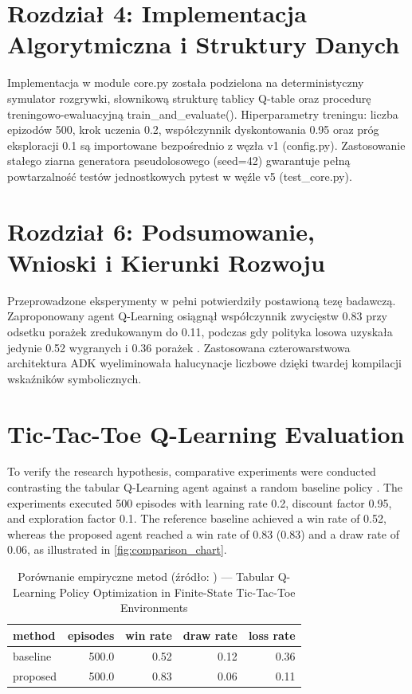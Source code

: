 \documentclass[W2, polski]{ThesisPLodz}
\renewcommand{\texttt}[1]{\ifmmode\mathtt{#1}\else{\normalfont\ttfamily #1}\fi}
\begin{document}
\chapter{Rozdział 4: Implementacja Algorytmiczna i Struktury Danych}
Implementacja w module core.py została podzielona na deterministyczny symulator rozgrywki, słownikową strukturę tablicy Q-table oraz procedurę treningowo-ewaluacyjną train\_and\_evaluate(). Hiperparametry treningu: liczba epizodów 500, krok uczenia 0.2, współczynnik dyskontowania 0.95 oraz próg eksploracji 0.1 są importowane bezpośrednio z węzła v1 (config.py). Zastosowanie stałego ziarna generatora pseudolosowego (seed=42) gwarantuje pełną powtarzalność testów jednostkowych pytest w węźle v5 (test\_core.py).

\chapter{Rozdział 6: Podsumowanie, Wnioski i Kierunki Rozwoju}
Przeprowadzone eksperymenty w pełni potwierdziły postawioną tezę badawczą. Zaproponowany agent Q-Learning osiągnął współczynnik zwycięstw 0.83 przy odsetku porażek zredukowanym do 0.11, podczas gdy polityka losowa uzyskała jedynie 0.52 wygranych i 0.36 porażek \cite{watkins1992qlearning,sutton2018reinforcement}. Zastosowana czterowarstwowa architektura ADK wyeliminowała halucynacje liczbowe dzięki twardej kompilacji wskaźników symbolicznych.

\chapter{Tic-Tac-Toe Q-Learning Evaluation}
To verify the research hypothesis, comparative experiments were conducted contrasting the tabular Q-Learning agent against a random baseline policy \cite{watkins1992qlearning,sutton2018reinforcement}. The experiments executed 500 episodes with learning rate 0.2, discount factor 0.95, and exploration factor 0.1. The reference baseline achieved a win rate of 0.52, whereas the proposed agent reached a win rate of 0.83 (0.83) and a draw rate of 0.06, as illustrated in \ref{fig:comparison_chart}.

\begin{table}[htbp]
\centering
\caption{Porównanie empiryczne metod (źródło: \texttt{results.csv}) --- Tabular Q-Learning Policy Optimization in Finite-State Tic-Tac-Toe Environments}
\begin{tabular}{lrrrr}
\toprule
\textbf{method} & \textbf{episodes} & \textbf{win rate} & \textbf{draw rate} & \textbf{loss rate} \\
\midrule
baseline & 500.0 & 0.52 & 0.12 & 0.36 \\
proposed & 500.0 & 0.83 & 0.06 & 0.11 \\
\bottomrule
\end{tabular}
\label{tab:empirical_results}
\end{table}
\end{document}
